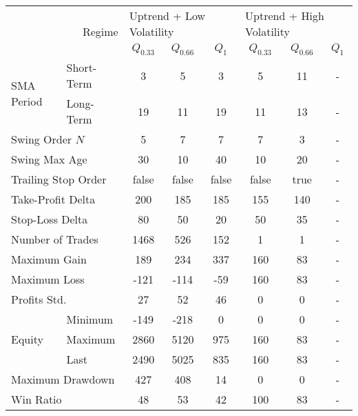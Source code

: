 \centering
\begin{tabular}{ll|cccccc}
    \toprule
    \multicolumn{2}{r|}{\multirow{2}{*}{Regime}} & \multicolumn{3}{l}{Uptrend + Low Volatility}     & \multicolumn{3}{l}{Uptrend + High Volatility}     \\
    \multicolumn{2}{r|}{} & $Q_{0.33}$ & $Q_{0.66}$ & $Q_{1}$ & $Q_{0.33}$ & $Q_{0.66}$ & $Q_{1}$ \\
    \midrule
    \multirow{2}{*}{SMA Period}            & Short-Term & 3    & 5    & 3   & 5   & 11  & - \\
    & Long-Term  & 19   & 11   & 19  & 11  & 13  & - \\
    \multicolumn{2}{l|}{Swing Order $N$} & 5 & 7 & 7 & 7 & 3 & - \\
    \multicolumn{2}{l|}{Swing Max Age} & 30 & 10 & 40 & 10 & 20 & - \\
    \multicolumn{2}{l|}{Trailing Stop Order} & false & false & false & false & true & - \\
    \multicolumn{2}{l|}{Take-Profit Delta} & 200 & 185 & 185 & 155 & 140 & - \\
    \multicolumn{2}{l|}{Stop-Loss Delta} & 80 & 50 & 20 & 50 & 35 & - \\
    \midrule
    \multicolumn{2}{l|}{Number of Trades} & 1468 & 526 & 152 & 1 & 1 & - \\
    \multicolumn{2}{l|}{Maximum Gain} & 189 & 234 & 337 & 160 & 83 & - \\
    \multicolumn{2}{l|}{Maximum Loss} & -121 & -114 & -59 & 160 & 83 & - \\
    \multicolumn{2}{l|}{Profits Std.} & 27 & 52 & 46 & 0 & 0 & - \\
    \multirow{3}{*}{Equity}                & Minimum    & -149 & -218 & 0   & 0   & 0   & - \\
    & Maximum    & 2860 & 5120 & 975 & 160 & 83  & - \\
    & Last       & 2490 & 5025 & 835 & 160 & 83  & - \\
    \multicolumn{2}{l|}{Maximum Drawdown} & 427 & 408 & 14 & 0 & 0 & - \\
    \multicolumn{2}{l|}{Win Ratio} & 48 & 53 & 42 & 100 & 83 & - \\
    \bottomrule
\end{tabular}